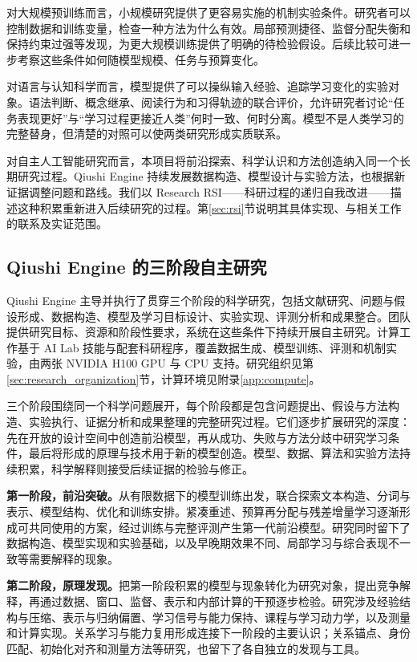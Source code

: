 对大规模预训练而言，小规模研究提供了更容易实施的机制实验条件。研究者可以控制数据和训练变量，检查一种方法为什么有效。局部预测捷径、监督分配失衡和保持约束过强等发现，为更大规模训练提供了明确的待检验假设。后续比较可进一步考察这些条件如何随模型规模、任务与预算变化。

对语言与认知科学而言，模型提供了可以操纵输入经验、追踪学习变化的实验对象。语法判断、概念继承、阅读行为和习得轨迹的联合评价，允许研究者讨论“任务表现更好”与“学习过程更接近人类”何时一致、何时分离。模型不是人类学习的完整替身，但清楚的对照可以使两类研究形成实质联系。

对自主人工智能研究而言，本项目将前沿探索、科学认识和方法创造纳入同一个长期研究过程。Qiushi Engine 持续发展数据构造、模型设计与实验方法，也根据新证据调整问题和路线。我们以 Research RSI——科研过程的递归自我改进——描述这种积累重新进入后续研究的过程。第\ref{sec:rsi}节说明其具体实现、与相关工作的联系及实证范围。

\subsection{Qiushi Engine 的三阶段自主研究}

Qiushi Engine 主导并执行了贯穿三个阶段的科学研究，包括文献研究、问题与假设形成、数据构造、模型及学习目标设计、实验实现、评测分析和成果整合。团队提供研究目标、资源和阶段性要求，系统在这些条件下持续开展自主研究。计算工作基于 AI Lab 技能与配套科研程序，覆盖数据生成、模型训练、评测和机制实验，由两张 NVIDIA H100 GPU 与 CPU 支持。研究组织见第\ref{sec:research_organization}节，计算环境见附录\ref{app:compute}。

三个阶段围绕同一个科学问题展开，每个阶段都是包含问题提出、假设与方法构造、实验执行、证据分析和成果整理的完整研究过程。它们逐步扩展研究的深度：先在开放的设计空间中创造前沿模型，再从成功、失败与方法分歧中研究学习条件，最后将形成的原理与技术用于新的模型创造。模型、数据、算法和实验方法持续积累，科学解释则接受后续证据的检验与修正。

\textbf{第一阶段，前沿突破。}从有限数据下的模型训练出发，联合探索文本构造、分词与表示、模型结构、优化和训练安排。紧凑重述、预算再分配与残差增量学习逐渐形成可共同使用的方案，经过训练与完整评测产生第一代前沿模型。研究同时留下了数据构造、模型实现和实验基础，以及早晚期效果不同、局部学习与综合表现不一致等需要解释的现象。

\textbf{第二阶段，原理发现。}把第一阶段积累的模型与现象转化为研究对象，提出竞争解释，再通过数据、窗口、监督、表示和内部计算的干预逐步检验。研究涉及经验结构与压缩、表示与归纳偏置、学习信号与能力保持、课程与学习动力学，以及测量和计算实现。关系学习与能力复用形成连接下一阶段的主要认识；关系锚点、身份匹配、初始化对齐和测量方法等研究，也留下了各自独立的发现与工具。


